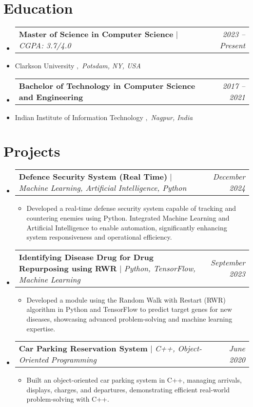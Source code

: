 \documentclass[letterpaper,10pt]{article}
\makeatletter
\newcommand{\subheadingtitlevspace}{
\vspace{-3pt}
}
\newcommand{\resumeItem}[1]{
  \item{
    {#1 \vspace{-4pt}}
  }
}
\newcommand{\titleItem}[1]{
  \textbf{#1}
}
\newcommand{\resumeProjectHeading}[2]{
    \item
    \begin{tabular*}{0.97\textwidth}{l@{\extracolsep{\fill}}r}
      #1 & \textit{ #2} \\
    \end{tabular*}\vspace{-9pt}
}
\newcommand{\resumeSubHeadingListStart}{\subheadingtitlevspace\begin{itemize}[leftmargin=0.15in, label={}]}
\newcommand{\resumeSubHeadingListEnd}{\end{itemize}}
\newcommand{\resumeItemListStart}{
\begin{itemize}}
\newcommand{\resumeItemListEnd}{
\end{itemize}\vspace{-8pt}}
\makeatother
\begin{document}
\section{Education}    
    \resumeSubHeadingListStart
        \resumeProjectHeading
           {\titleItem{{Master of Science in Computer Science}} $|$ \emph{CGPA: 3.7/4.0}}{2023 -- Present}
           \resumeItem{{Clarkson University} $,$ \emph{Potsdam, NY, USA}}
        \resumeProjectHeading
           {\titleItem{{Bachelor of Technology in Computer Science and Engineering}}}{2017 -- 2021}
           \resumeItem{{Indian Institute of Information Technology} $,$ \emph{Nagpur, India}}
    \resumeSubHeadingListEnd




 \section{Projects}    
     \resumeSubHeadingListStart
      \resumeProjectHeading
           {\titleItem{Defence Security System (Real Time)} $|$ \emph{Machine Learning, Artificial Intelligence, Python}}{December 2024}
            \resumeItemListStart
            \resumeItem{Developed a real-time defense security system capable of tracking and countering enemies using Python. Integrated Machine Learning and Artificial Intelligence to enable automation, significantly enhancing system responsiveness and operational efficiency.}
           \resumeItemListEnd
        \resumeProjectHeading
           {\titleItem{Identifying Disease Drug for Drug Repurposing using RWR} $|$ \emph{Python, TensorFlow, Machine Learning}}{September 2023}
            \resumeItemListStart
            \resumeItem{Developed a module using the Random Walk with Restart (RWR) algorithm in Python and TensorFlow to predict target genes for new diseases, showcasing advanced problem-solving and machine learning expertise.}
           \resumeItemListEnd
        \resumeProjectHeading
           {\titleItem{Car Parking Reservation System} $|$ \emph{C++, Object-Oriented Programming}}{June 2020}
            \resumeItemListStart
            \resumeItem{Built an object-oriented car parking system in C++, managing arrivals, displays, charges, and departures, demonstrating efficient real-world problem-solving with C++.}
           \resumeItemListEnd
       
     \resumeSubHeadingListEnd


\end{document}
